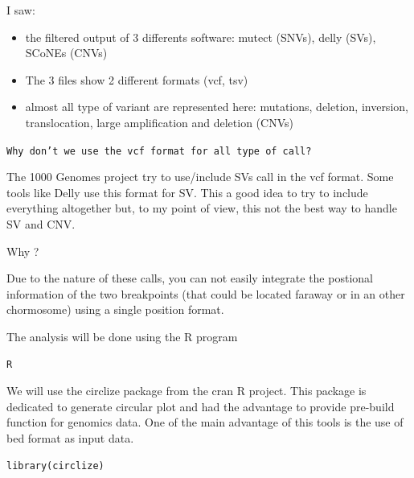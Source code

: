 \begin{answer}
I saw:
\begin{itemize}
  \item the filtered output of 3 differents software: mutect (SNVs), delly (SVs), SCoNEs (CNVs)
  \item The 3 files show 2 different formats (vcf, tsv)
  \item almost all type of variant are represented here: mutations, deletion, inversion, translocation, large amplification and deletion (CNVs)
\end{itemize}
\end{answer}




\begin{questions}
\texttt{Why don't we use the vcf format for all type of call?}
\end{questions}


\begin{answer}
The 1000 Genomes project try to use/include SVs call in the vcf format. Some tools like Delly use this format for SV. This a good idea to try to include everything altogether but, to my point of view, this not the best way to handle SV and CNV. 

Why ?

Due to the nature of these calls, you can not easily integrate the postional information of the two breakpoints (that could be located faraway or in an other chormosome) using a single position format.
\end{answer}



The analysis will be done using the R program

\begin{steps}
\begin{lstlisting}
R
\end{lstlisting}
\end{steps}

We will use the circlize package from the cran R project. This package is dedicated to generate circular plot and had the advantage to provide pre-build function for genomics data. One of the main advantage of this tools is the use of bed format as input data.

\begin{steps}
\begin{lstlisting}
library(circlize)
\end{lstlisting}
\end{steps}


